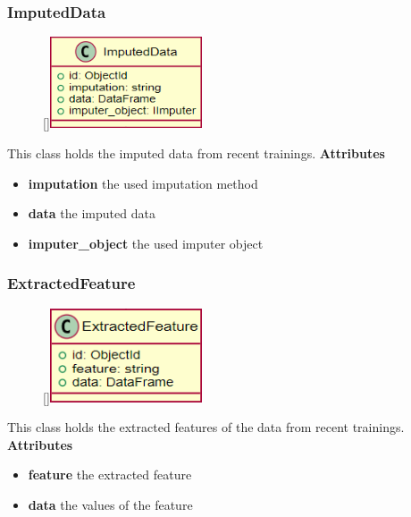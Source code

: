 \subsubsection{ImputedData}
\label{ImputedData}
\begin{figure}
    \raisebox{0pt}[\dimexpr{}\baselineskip\relax]{\includegraphics[width=4.5cm]{classes/model-management/16.png}}
\end{figure} 
\par
This class holds the imputed data from recent trainings.
\newline
\newline
\textbf{Attributes}
\begin{itemize}
    \item \textbf{imputation} the used imputation method
    \item \textbf{data} the imputed data
    \item \textbf{imputer\_object} the used imputer object
\end{itemize}

\subsubsection{ExtractedFeature}
\label{ExtractedFeature}
\begin{figure}
    \raisebox{0pt}[\dimexpr{}\baselineskip\relax]{\includegraphics[width=4.5cm]{classes/model-management/17.png}}
\end{figure} 
\par
This class holds the extracted features of the data from recent trainings.
\newline
\newline
\textbf{Attributes}
\begin{itemize}
    \item \textbf{feature} the extracted feature
    \item \textbf{data} the values of the feature
\end{itemize}
